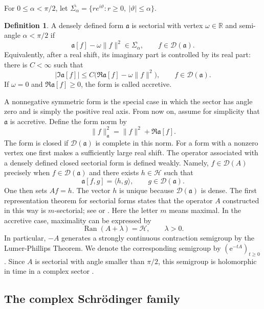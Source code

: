\documentclass[11pt,reqno]{amsart}
\theoremstyle{definition}
\newtheorem{definition}[theorem]{Definition}
\numberwithin{equation}{section}
\newcommand{\<}{\langle}
\renewcommand{\>}{\rangle}
\begin{document}
\begin{appendix}
For $0\leq\alpha<\pi/2$, let
$\overline{\Sigma_\alpha}
  =\{re^{i\vartheta}:r\geq0,\ |\vartheta|\leq\alpha\}$.
\begin{definition}
\label{def:sectorial-form}
A densely defined form $\mathfrak a$ is sectorial with vertex
$\omega\in\mathbb R$ and semi-angle $\alpha<\pi/2$ if
\[
  \mathfrak a[f]-\omega\|f\|^2\in\overline{\Sigma_\alpha},
  \qquad f\in\mathcal D(\mathfrak a).
\]
Equivalently, after a real shift, its imaginary part is controlled by its real
part: there is $C<\infty$ such that
\[
  |\Im \mathfrak a[f]|
  \leq C\bigl(\Re\mathfrak a[f]-\omega\|f\|^2\bigr),
  \qquad f\in\mathcal D(\mathfrak a).
\]
If $\omega=0$ and $\Re \mathfrak a[f]\geq0$, the form is called
accretive.
\end{definition}
 A nonnegative symmetric form is the
special case in which the sector has angle zero and is simply the positive
real axis.
From now on, assume for simplicity that $\mathfrak a$ is accretive. Define the form norm by
\[
  \|f\|_{\mathfrak a}^2
  =\|f\|^2+\Re \mathfrak a[f].
\]
The form is closed if $\mathcal D(\mathfrak a)$ is complete in this norm.  For
a form with a nonzero vertex one first makes a sufficiently large real shift.
The operator associated with a densely defined closed sectorial form is
defined weakly.  Namely, $f\in\mathcal D(A)$ precisely when
$f\in\mathcal D(\mathfrak a)$ and there exists $h\in\mathcal H$ such that
\begin{equation}
  \mathfrak a[f,g]=\langle h,g\rangle,
  \qquad g\in\mathcal D(\mathfrak a).
  \label{eq:associated-operator-definition}
\end{equation}
One then sets $Af=h$.  The vector $h$ is unique because
$\mathcal D(\mathfrak a)$ is dense.
The first representation theorem for sectorial forms states that the
operator $A$ constructed in this way is $m$-sectorial; see
\cite[Chapter~VI, Section~2]{Kato} or
\cite[Chapter~1]{OuhabazHeat}.  Here the letter $m$ means maximal.  In the
accretive case, maximality can be expressed by
\[
       \operatorname{Ran}(A+\lambda)=\mathcal H,
       \qquad \lambda>0.
\]
In particular, $-A$ generates a strongly continuous contraction semigroup by the Lumer-Phillips Theorem. We denote the corresponding semigroup by $(\mathrm e^{-tA})_{t\geq0}$.  Since $A$ is sectorial with angle smaller
than $\pi/2$, this semigroup is holomorphic in time in a complex sector \cite[Chapter IX, Theorem 1.24]{Kato}.
\subsection{The complex Schr\"odinger family}
\label{subsec:complex-schrodinger-family}


\end{appendix}
\end{document}
